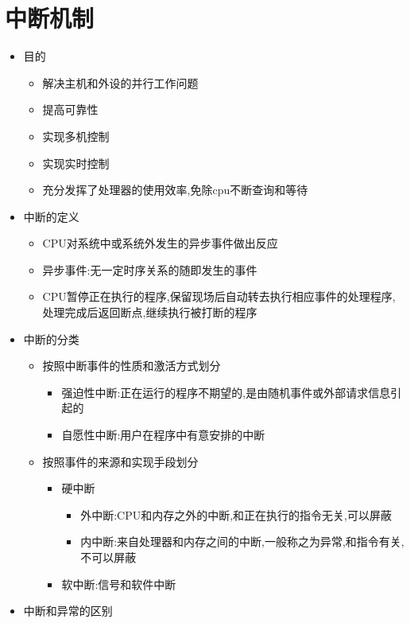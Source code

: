 \documentclass[a4paper,12pt,notitlepage]{article}
\begin{document}
\section{中断机制}
\begin{itemize}
	\item 目的
	\begin{itemize}
		\item 解决主机和外设的并行工作问题
		\item 提高可靠性
		\item 实现多机控制
		\item 实现实时控制
		\item 充分发挥了处理器的使用效率,免除cpu不断查询和等待
	\end{itemize}
	\item 中断的定义
	\begin{itemize}
		\item CPU对系统中或系统外发生的异步事件做出反应
		\item 异步事件:无一定时序关系的随即发生的事件
		\item CPU暂停正在执行的程序,保留现场后自动转去执行相应事件的处理程序,处理完成后返回断点,继续执行被打断的程序
	\end{itemize}
	\item 中断的分类
	\begin{itemize}
		\item 按照中断事件的性质和激活方式划分
		\begin{itemize}
			\item 强迫性中断:正在运行的程序不期望的,是由随机事件或外部请求信息引起的
			\item 自愿性中断:用户在程序中有意安排的中断
		\end{itemize}
		\item 按照事件的来源和实现手段划分
		\begin{itemize}
			\item 硬中断
			\begin{itemize}
				\item 外中断:CPU和内存之外的中断,和正在执行的指令无关,可以屏蔽
				\item 内中断:来自处理器和内存之间的中断,一般称之为异常,和指令有关,不可以屏蔽
			\end{itemize}
			\item 软中断:信号和软件中断
		\end{itemize}
	\end{itemize}
	\item 中断和异常的区别
	\begin{itemize}

\end{itemize}
\end{itemize}
\end{document}
